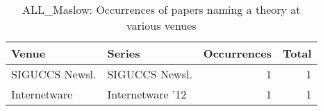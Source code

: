 \begin{table*}[t]
\begin{tabular}{llrr}
Venue & Series & Occurrences & Total\\\hline
\multirow{1}{*}{SIGUCCS Newsl.} & SIGUCCS Newsl. & 1 & \multirow{1}{*}{1}\\
\multirow{1}{*}{Internetware } & Internetware '12 & 1 & \multirow{1}{*}{1}\\
\end{tabular}
\caption{ALL\_Maslow: Occurrences of papers naming a theory at various venues}
\end{table*}